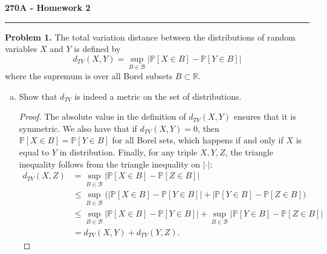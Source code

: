 \documentclass[11pt,letterpaper]{report}
\newcommand{\reals}{\mathbb{R}}
\newcommand{\mcal}[1]{\mathcal{#1}}
\newcommand{\Prob}{\mathbb{P}}
\begin{document}
\begin{center}
{\bf \Large 270A - Homework 2}
\vspace{0.2cm}
\hrule
\end{center}

\noindent\textbf{Problem 1. }
The total variation distance between the distributions of random variables $X$ and $Y$ is defined by
\[
d_{TV}(X, Y) = \sup_{B\in \mcal{B}}|\Prob[X\in B] - \Prob[Y\in B]|
\]
where the supremum is over all Borel subsets $B\subset \reals$.

\begin{enumerate}[(a)]
	\item Show that $d_{TV}$ is indeed a metric on the set of distributions.
	\begin{proof}
		The absolute value in the definition of $d_{TV}(X,Y)$ ensures that it is symmetric. We also have that if $d_{TV}(X,Y) = 0$, then $\Prob[X\in B] = \Prob[Y\in B]$ for all Borel sets, which happens if and only if $X$ is equal to $Y$ in distribution. Finally, for any triple $X, Y, Z$, the triangle inequality follows from the triangle inequality on $|\cdot|$:
		\begin{align*}
			d_{TV}(X, Z) &= \sup_{B\in \mcal{B}}|\Prob[X\in B] - \Prob[Z\in B]|\\
			&\leq \sup_{B\in \mcal{B}}\big(|\Prob[X\in B] - \Prob[Y\in B]| + |\Prob[Y\in B]- \Prob[Z\in B]\big)\\
			&\leq \sup_{B\in \mcal{B}}|\Prob[X\in B] - \Prob[Y\in B]| + \sup_{B\in \mcal{B}}|\Prob[Y\in B] - \Prob[Z\in B]|\\
			&= d_{TV}(X,Y) + d_{TV}(Y, Z).
		\end{align*}
	\end{proof}


\end{enumerate}
\end{document}
